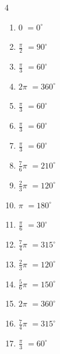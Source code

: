 \begin{multicols}{4}
\begin{enumerate}
  \item $\displaystyle 0$
        $\displaystyle =0^{\circ}$

  \item $\displaystyle \frac{\pi}{2}$
        $\displaystyle =90^{\circ}$

  \item $\displaystyle \frac{\pi}{3}$
        $\displaystyle =60^{\circ}$

  \item $\displaystyle 2\pi$
        $\displaystyle =360^{\circ}$

  \item $\displaystyle \frac{\pi}{3}$
        $\displaystyle =60^{\circ}$

  \item $\displaystyle \frac{\pi}{3}$
        $\displaystyle =60^{\circ}$

  \item $\displaystyle \frac{\pi}{3}$
        $\displaystyle =60^{\circ}$

  \item $\displaystyle \frac{7}{6}\pi$
        $\displaystyle =210^{\circ}$

  \item $\displaystyle \frac{2}{3}\pi$
        $\displaystyle =120^{\circ}$

  \item $\displaystyle \pi$
        $\displaystyle =180^{\circ}$

  \item $\displaystyle \frac{\pi}{6}$
        $\displaystyle =30^{\circ}$

  \item $\displaystyle \frac{7}{4}\pi$
        $\displaystyle =315^{\circ}$

  \item $\displaystyle \frac{2}{3}\pi$
        $\displaystyle =120^{\circ}$

  \item $\displaystyle \frac{5}{6}\pi$
        $\displaystyle =150^{\circ}$

\columnbreak %

  \item $\displaystyle 2\pi$
        $\displaystyle =360^{\circ}$

  \item $\displaystyle \frac{7}{4}\pi$
        $\displaystyle =315^{\circ}$

  \item $\displaystyle \frac{\pi}{3}$
        $\displaystyle =60^{\circ}$


\end{enumerate}
\end{multicols}
